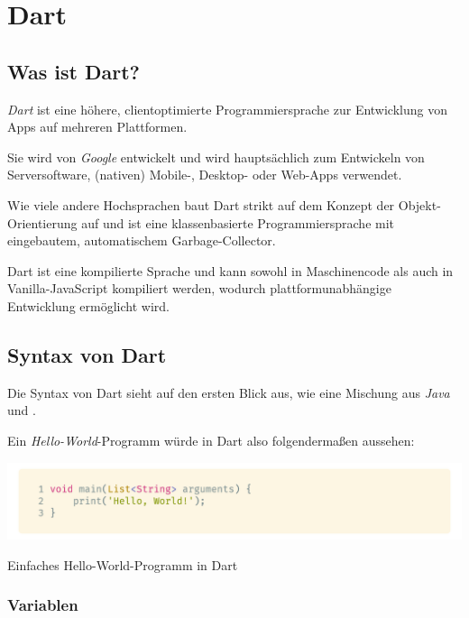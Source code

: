 \section{Dart}
\label{dart}

\subsection{Was ist Dart?}

\textit{Dart} ist eine höhere, clientoptimierte Programmiersprache zur Entwicklung von Apps auf mehreren Plattformen.

Sie wird von \textit{Google} entwickelt und wird hauptsächlich zum Entwickeln von Serversoftware, (nativen) Mobile-, Desktop- oder Web-Apps verwendet.

Wie viele andere Hochsprachen baut Dart strikt auf dem Konzept der Objekt-Orientierung auf und ist eine klassenbasierte Programmiersprache mit eingebautem, automatischem
Garbage-Collector.

Dart ist eine kompilierte Sprache und kann sowohl in Maschinencode als auch in Vanilla-JavaScript kompiliert werden, wodurch plattformunabhängige Entwicklung ermöglicht 
wird.

\subsection{Syntax von Dart}

Die Syntax von Dart sieht auf den ersten Blick aus, wie eine Mischung aus \textit{Java} und .

Ein \textit{Hello-World}-Programm würde in Dart also folgendermaßen aussehen:

\begin{code}[h]
    \centering
    \includegraphics[width=1\textwidth]{images/Dart/theory/dartHelloWorld.png}
    \vspace{-25pt}
    \caption{Einfaches Hello-World-Programm in Dart}
\end{code}

\subsubsection{Variablen}

